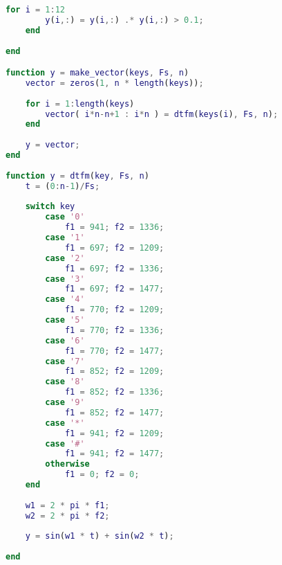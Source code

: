 \documentclass[11pt, a4paper]{article}
\begin{document}
\begin{lstlisting}[language=matlab, frame=single]
    for i = 1:12
        y(i,:) = y(i,:) .* y(i,:) > 0.1;
    end
    
end

function y = make_vector(keys, Fs, n)
    vector = zeros(1, n * length(keys));
    
    for i = 1:length(keys)
        vector( i*n-n+1 : i*n ) = dtfm(keys(i), Fs, n);
    end
    
    y = vector;
end
        
function y = dtfm(key, Fs, n)
    t = (0:n-1)/Fs;
    
    switch key
        case '0'
            f1 = 941; f2 = 1336;
        case '1'
            f1 = 697; f2 = 1209;
        case '2'
            f1 = 697; f2 = 1336;
        case '3'
            f1 = 697; f2 = 1477;
        case '4'
            f1 = 770; f2 = 1209;
        case '5'
            f1 = 770; f2 = 1336;
        case '6'
            f1 = 770; f2 = 1477;
        case '7'
            f1 = 852; f2 = 1209;
        case '8'
            f1 = 852; f2 = 1336;
        case '9'
            f1 = 852; f2 = 1477;
        case '*'
            f1 = 941; f2 = 1209;
        case '#'
            f1 = 941; f2 = 1477;
        otherwise
            f1 = 0; f2 = 0;
    end
    
    w1 = 2 * pi * f1;
    w2 = 2 * pi * f2;
    
    y = sin(w1 * t) + sin(w2 * t);
    
end
\end{lstlisting}        
\end{document}
